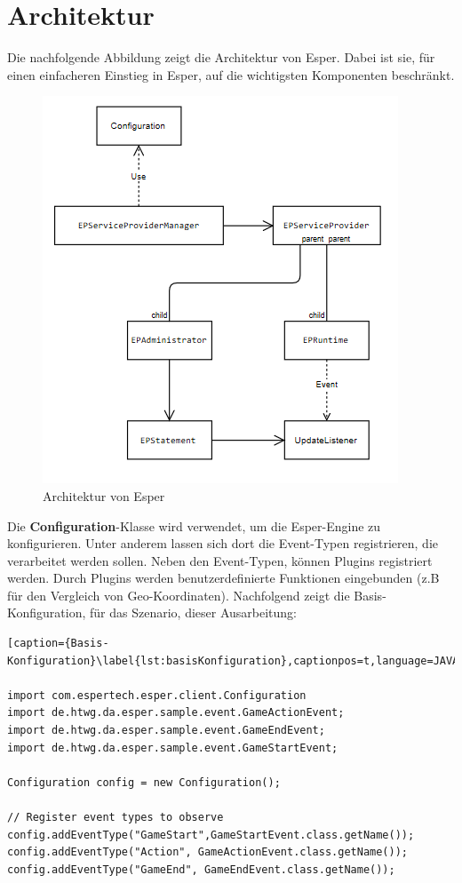 \chapter{Architektur}
Die nachfolgende Abbildung zeigt die Architektur von Esper.
Dabei ist sie, für einen einfacheren Einstieg in Esper, auf die wichtigsten Komponenten beschränkt.

\begin{figure}[ht]
	\centering
	\includegraphics{images/Architektur.png}
	\caption{Architektur von Esper}
	\label{architektur}
\end{figure}

Die \textbf{Configuration}-Klasse wird verwendet, um die Esper-Engine zu konfigurieren. Unter anderem lassen sich dort die Event-Typen registrieren, die verarbeitet werden sollen. Neben den Event-Typen, können Plugins registriert werden. Durch Plugins werden benutzerdefinierte Funktionen eingebunden (z.B für den Vergleich von Geo-Koordinaten).
Nachfolgend zeigt die Basis-Konfiguration, für das Szenario, dieser Ausarbeitung:

\begin{lstlisting}[caption={Basis-Konfiguration}\label{lst:basisKonfiguration},captionpos=t,language=JAVA]

import com.espertech.esper.client.Configuration
import de.htwg.da.esper.sample.event.GameActionEvent;
import de.htwg.da.esper.sample.event.GameEndEvent;
import de.htwg.da.esper.sample.event.GameStartEvent;

Configuration config = new Configuration();

// Register event types to observe
config.addEventType("GameStart",GameStartEvent.class.getName());
config.addEventType("Action", GameActionEvent.class.getName());
config.addEventType("GameEnd", GameEndEvent.class.getName());
\end{lstlisting}

